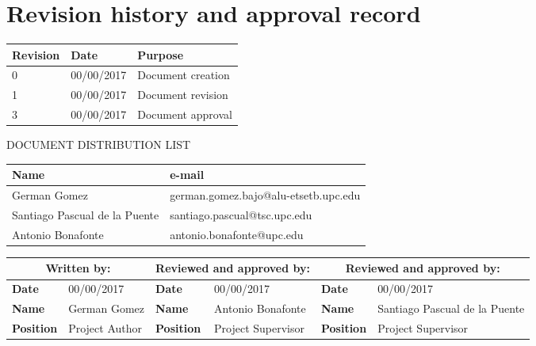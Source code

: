 
\chapter*{Revision history and approval record}

\begin{table}[h]
\centering
\begin{tabular}{| m{5em}| m{10em} | m{15em} |}
\hline
\textbf{Revision} & \textbf{Date} & \textbf{Purpose}\\ [0.5ex]
\hline
0   &   00/00/2017  &   Document creation   \\ [0.5ex]
\hline
1   &   00/00/2017  &   Document revision   \\ [0.5ex]
\hline
3   &   00/00/2017  &   Document approval   \\ [0.5ex]
\hline
\end{tabular}
\end{table}

\vspace{2cm}

DOCUMENT DISTRIBUTION LIST

\begin{table}[h]
\centering
\begin{tabular}{| m{15em}| m{20em}|}
\hline
\textbf{Name} & \textbf{e-mail} \\ [0.5ex]
\hline
German Gomez         & german.gomez.bajo@alu-etsetb.upc.edu \\ [0.5ex]
\hline
Santiago Pascual de la Puente & santiago.pascual@tsc.upc.edu \\ [0.5ex]
\hline
Antonio Bonafonte       & antonio.bonafonte@upc.edu \\ [0.5ex]
\hline
\end{tabular}
\end{table}

\vspace{2cm}

\begin{table}[h]
\centering
\begin{tabular}{| m{4em}| m{7em}| m{4em}| m{7em}| m{4em}| m{7em}|}
\hline
\multicolumn{2}{|c|}{\textbf{Written by:}} & \multicolumn{2}{c}{\textbf{Reviewed and approved by:}} & \multicolumn{2}{|c|}{\textbf{Reviewed and approved by:}} \\ [0.5ex]
\hline
\textbf{Date}     & 00/00/2017 & \textbf{Date} & 00/00/2017 & \textbf{Date} & 00/00/2017\\ [0.5ex]
\hline
\textbf{Name}     & German Gomez & \textbf{Name} & Antonio Bonafonte & \textbf{Name} & Santiago Pascual de la Puente \\ [0.5ex]
\hline
\textbf{Position} & Project Author & \textbf{Position} & Project Supervisor & \textbf{Position} & Project Supervisor \\ [0.5ex]
\hline
\end{tabular}
\end{table}
